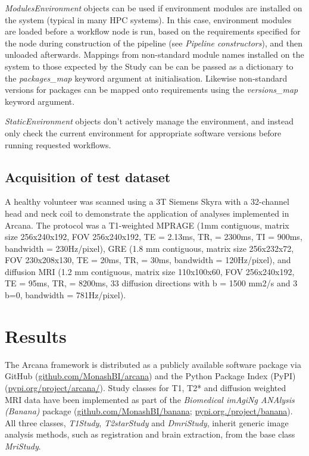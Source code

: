\documentclass[smallextended]{svjour3}       %
\begin{document}
\emph{ModulesEnvironment} objects can be used if environment
modules \citep{furlani_modules:_1991} are installed on the system (typical in many
HPC systems). In this case, environment modules are loaded before a workflow node is run,
based on the requirements specified for the node during construction of the pipeline
(see \emph{Pipeline constructors}), and then unloaded afterwards. Mappings from non-standard
module names installed on the system to those expected by the Study can be
can be passed as a dictionary to the \emph{packages\_map} keyword argument
at initialisation. Likewise non-standard versions for packages can be mapped onto
requirements using the \emph{versions\_map} keyword argument.

\emph{StaticEnvironment} objects don't actively manage the environment,
and instead only check the current environment for appropriate software
versions before running requested workflows.

\subsection*{Acquisition of test dataset}

A healthy volunteer was scanned using a 3T Siemens Skyra with a 32-channel head
and neck coil to demonstrate the application of analyses implemented in
Arcana. The protocol was a T1-weighted MPRAGE (1mm contiguous,
matrix size 256x240x192, FOV 256x240x192, TE = 2.13ms, TR, = 2300ms, TI
= 900ms, bandwidth = 230Hz/pixel), GRE (1.8 mm contiguous, matrix size
256x232x72, FOV 230x208x130, TE = 20ms, TR, = 30ms,
bandwidth = 120Hz/pixel), and diffusion MRI (1.2 mm contiguous, matrix size
110x100x60, FOV 256x240x192, TE = 95ms, TR, = 8200ms, 33 diffusion
directions with b = 1500 mm2/s and 3 b=0, bandwidth = 781Hz/pixel).

\section*{Results}
\label{results}

The Arcana framework is distributed as a publicly available software
package via GitHub (\url{github.com/MonashBI/arcana}) and the
Python Package Index (PyPI) (\url{pypi.org/project/arcana/}).
Study classes for T1, T2* and diffusion weighted MRI data have been
implemented as part of the \emph{Biomedical imAgiNg ANAlysis (Banana)} package
(\url{github.com/MonashBI/banana}; \url{pypi.org./project/banana}).
All three classes, \emph{T1Study}, \emph{T2starStudy} and
\emph{DmriStudy}, inherit generic image analysis methods, such as
registration and brain extraction, from the base class \emph{MriStudy}.
\end{document}
